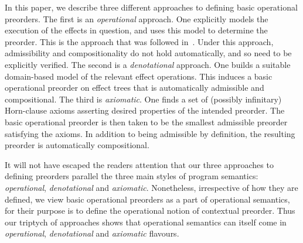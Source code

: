 In this paper, we describe three different approaches to defining basic operational preorders. 
The first is an \emph{operational} approach. One explicitly models the execution of the effects in question, and uses this model to determine the preorder. This is the approach that was followed 
in~\cite{gom}. Under this approach, admissibility and compositionality do not hold automatically, and so need to be explicitly verified. The second is a  \emph{denotational} approach. One builds a suitable domain-based model of the relevant effect operations. This induces a basic operational preorder on  effect trees that is automatically admissible and compositional. 
The third is \emph{axiomatic}. One finds a set of (possibly infinitary) Horn-clause axioms asserting desired properties of the intended preorder. The basic operational preorder is then taken to be the smallest admissible preorder satisfying the axioms. In addition to being admissible by definition, the resulting preorder is automatically compositional. 

It will not have escaped the readers attention that our three approaches to defining preorders  parallel the three main styles of program semantics: \emph{operational}, \emph{denotational} and \emph{axiomatic}. Nonetheless, irrespective of how they are defined, we view basic operational preorders as a part of operational semantics, for their purpose is to define the operational notion of contextual preorder. Thus our triptych of approaches shows that operational semantics can itself come in
 \emph{operational}, \emph{denotational} and \emph{axiomatic} flavours. 

